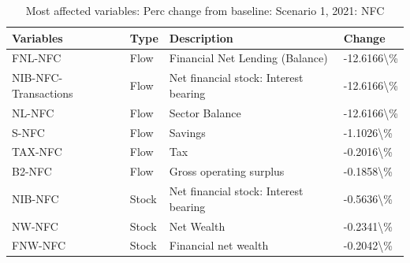 \documentclass[
]{book}
\begin{document}
\vspace{1cm}
\begin{table}

\caption{\label{tab:most-affected-scenario-1-perc-2020-NFC}Most affected variables: Perc change from baseline: Scenario 1, 2021: NFC}
\centering
\fontsize{10}{12}\selectfont
\begin{tabular}[t]{l|l|l|l}
\hline
Variables & Type & Description & Change\\
\hline
FNL-NFC & Flow & Financial Net Lending (Balance) & -12.6166\textbackslash{}\%\\
\hline
NIB-NFC-Transactions & Flow & Net financial stock: Interest bearing & -12.6166\textbackslash{}\%\\
\hline
NL-NFC & Flow & Sector Balance & -12.6166\textbackslash{}\%\\
\hline
S-NFC & Flow & Savings & -1.1026\textbackslash{}\%\\
\hline
TAX-NFC & Flow & Tax & -0.2016\textbackslash{}\%\\
\hline
B2-NFC & Flow & Gross operating surplus & -0.1858\textbackslash{}\%\\
\hline
NIB-NFC & Stock & Net financial stock: Interest bearing & -0.5636\textbackslash{}\%\\
\hline
NW-NFC & Stock & Net Wealth & -0.2341\textbackslash{}\%\\
\hline
FNW-NFC & Stock & Financial net wealth & -0.2042\textbackslash{}\%\\
\hline
\end{tabular}
\end{table}
\end{document}
